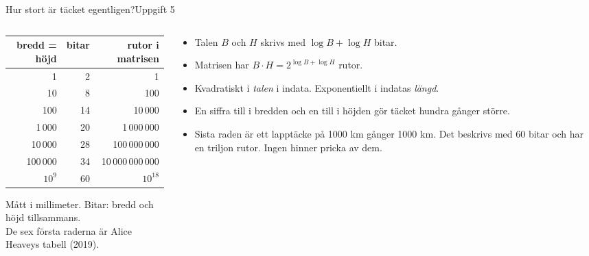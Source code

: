 \documentclass[aspectratio=169,10pt]{beamer}
\begin{document}
\begin{frame}{Hur stort är täcket egentligen?}{Uppgift 5}
  \begin{columns}[T]
    \begin{column}{0.5\textwidth}
      \centering
      \begin{tabular}{@{}rrr@{}}
        \toprule
        bredd = höjd & bitar & rutor i matrisen\\
        \midrule
        1 & 2 & 1\\
        10 & 8 & 100\\
        100 & 14 & 10\,000\\
        1\,000 & 20 & 1\,000\,000\\
        10\,000 & 28 & 100\,000\,000\\
        100\,000 & 34 & 10\,000\,000\,000\\
        \midrule
        $10^{9}$ & 60 & $10^{18}$\\
        \bottomrule
      \end{tabular}

      \vspace{1mm}
      {\scriptsize\textcolor{softgray}{Mått i millimeter. Bitar: bredd och höjd tillsammans.\\De sex första raderna är Alice Heaveys tabell (2019).}}
    \end{column}
    \begin{column}{0.48\textwidth}
      \begin{itemize}
        \item<2-> Talen $B$ och $H$ skrivs med $\log B+\log H$ bitar.
        \item<3-> Matrisen har $B\cdot H=2^{\log B+\log H}$ rutor.
        \item<4-> Kvadratiskt i \emph{talen} i indata. Exponentiellt i indatas \emph{längd}.
        \item<5-> En siffra till i bredden och en till i höjden gör täcket hundra gånger större.
        \item<6-> Sista raden är ett lapptäcke på 1000 km gånger 1000 km. Det beskrivs med 60 bitar och har en triljon rutor. Ingen hinner pricka av dem.
      \end{itemize}
    \end{column}
  \end{columns}
\end{frame}
\end{document}
